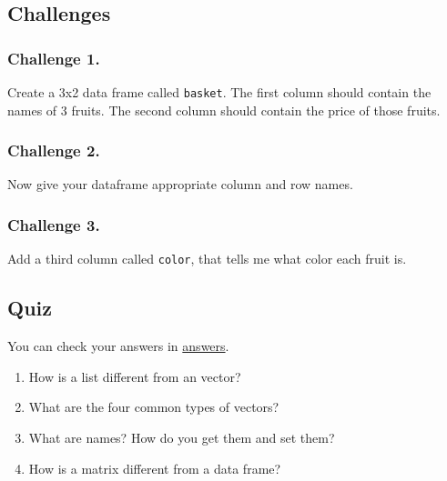 \documentclass[]{book}
\begin{document}
\hypertarget{challenges-8}{%
\subsection{Challenges}\label{challenges-8}}

\hypertarget{challenge-1.-3}{%
\subsubsection*{Challenge 1.}\label{challenge-1.-3}}

Create a 3x2 data frame called \texttt{basket}. The first column should contain the names of 3 fruits. The second column should contain the price of those fruits.

\hypertarget{challenge-2.-3}{%
\subsubsection*{Challenge 2.}\label{challenge-2.-3}}

Now give your dataframe appropriate column and row names.

\hypertarget{challenge-3.-2}{%
\subsubsection*{Challenge 3.}\label{challenge-3.-2}}

Add a third column called \texttt{color}, that tells me what color each fruit is.

\hypertarget{quiz}{%
\subsection{Quiz}\label{quiz}}

You can check your answers in \protect\hyperlink{data-structure-answers}{answers}.

\begin{enumerate}
\def\labelenumi{\arabic{enumi}.}
\item
  How is a list different from an vector?
\item
  What are the four common types of vectors?
\item
  What are names? How do you get them and set them?
\item
  How is a matrix different from a data frame?
\end{enumerate}
\end{document}
